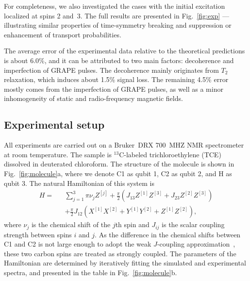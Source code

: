 \documentclass[aps,prx,10pt,
               superscriptaddress,
               twocolumn,
               longbibliography,
showpacs]{revtex4-1}
\theoremstyle{plain}
\theoremstyle{definition}
\newcommand{\site}[1]{^{[#1]}}  %
\begin{document}
For completeness, we also investigated the cases with the initial excitation localized at
spins 2 and~3. The full results are presented in Fig.~\ref{fig:exp}
--- illustrating similar properties of time-symmetry breaking and
suppression or enhancement of transport probabilities.

The average error of the experimental data relative to the theoretical
predictions is about 6.0\%, and it can be attributed to two main factors:
decoherence and imperfection of GRAPE pulses. The decoherence mainly
originates from $T_2$ relaxation, which induces about 1.5\% signal loss. The
remaining 4.5\% error mostly comes from the imperfection of GRAPE pulses,
as well as a minor inhomogeneity of static and
radio-frequency magnetic fields.





\subsection*{Experimental setup}

All experiments are carried out
on a Bruker~DRX 700~MHZ NMR spectrometer at room
temperature. The sample is  $^{13}$C-labeled trichloroethylene (TCE)
dissolved in deuterated chloroform.
The structure of the molecule is shown in
Fig.~\ref{fig:molecule}a, where we denote C1 as qubit 1, C2 as qubit 2, and H as qubit 3.
The natural Hamiltonian of this system is
\begin{eqnarray}\label{Hamiltonian}
H = &&\sum\limits_{j=1}^3 {\pi \nu_j } Z\site{j}  +
\frac{\pi}{2}(J_{13}Z\site{1} Z\site{3}+J_{23}Z\site{2} Z\site{3})
\nonumber\\
&&+ \frac{\pi}{2}J_{12} (X\site{1} X\site{2} +Y\site{1} Y\site{2} +Z\site{1} Z\site{2}),
\end{eqnarray}
where $\nu_j$ is the chemical shift of the $j$th spin and $J_{ij}$ is the scalar
coupling strength between spins $i$ and $j$. As the difference in the chemical shifts
between C1 and C2 is not large enough to adopt the weak $J$-coupling
approximation~\cite{nmrreview}, these two carbon spins are treated as strongly coupled.
The parameters of the Hamiltonian are determined by iteratively fitting the simulated and experimental spectra,
and presented in the table in Fig.~\ref{fig:molecule}b.
\end{document}

